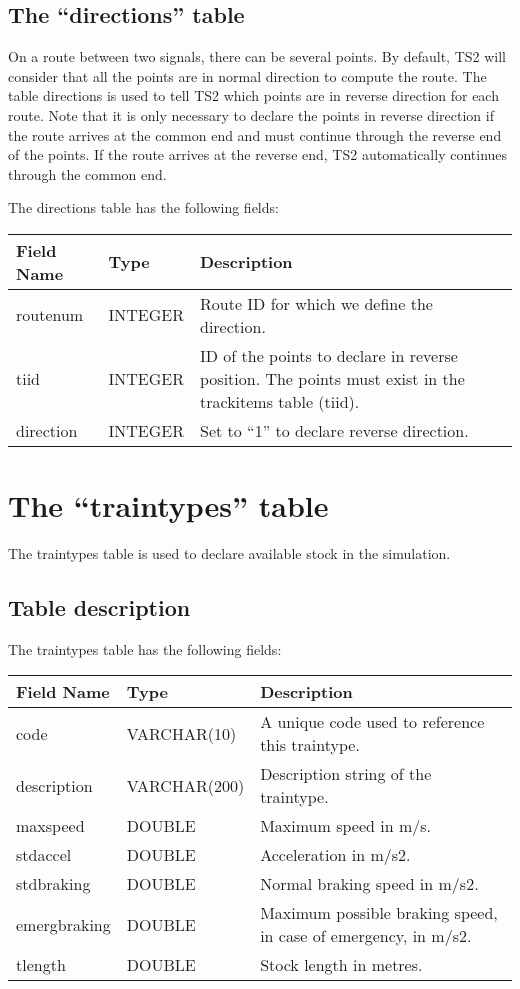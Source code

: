 \documentclass[12pt,a4paper]{article}
\begin{document}
\subsection{The ``directions'' table}
On a route between two signals, there can be several points. By default, TS2 will consider that all the points are in normal direction to compute the route. The table directions is used to tell TS2 which points are in reverse direction for each route. Note that it is only necessary to declare the points in reverse direction if the route arrives at the common end and must continue through the reverse end of the points. If the route arrives at the reverse end, TS2 automatically continues through the common end.

The directions table has the following fields:
\begin{center}
\begin{tabular}{|l|l|p{10cm}|}
\hline
\textbf{Field Name}&\textbf{Type}&\textbf{Description}\\
\hline
routenum&INTEGER&Route ID for which we define the direction.\\
\hline
tiid&INTEGER&ID of the points to declare in reverse position. The points must exist in the trackitems table (tiid).\\
\hline
direction&INTEGER&Set to ``1'' to declare reverse direction.\\
\hline
\end{tabular}
\end{center}

\section{The ``traintypes'' table}
The traintypes table is used to declare available stock in the simulation.

\subsection{Table description}
The traintypes table has the following fields:
\begin{center}
\begin{tabular}{|l|l|p{10cm}|}
\hline
\textbf{Field Name}&\textbf{Type}&\textbf{Description}\\
\hline
code&VARCHAR(10)&A unique code used to reference this traintype.\\
\hline
description&VARCHAR(200)&Description string of the traintype.\\
\hline
maxspeed&DOUBLE&Maximum speed in m/s.\\ 
\hline
stdaccel&DOUBLE&Acceleration in m/s2.\\
\hline
stdbraking&DOUBLE&Normal braking speed in m/s2.\\
\hline
emergbraking&DOUBLE&Maximum possible braking speed, in case of emergency, in m/s2.\\
\hline
tlength&DOUBLE&Stock length in metres.\\
\hline
\end{tabular}
\end{center}
\end{document}
